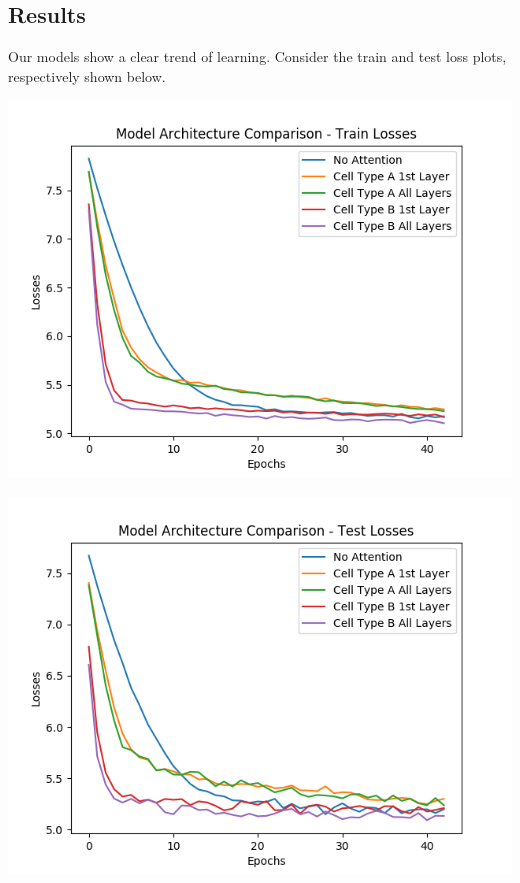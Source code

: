 \documentclass[letterpaper, 10pt]{article}
\begin{document}
\begin{multicols}{2}
\section{Results}

Our models show a clear trend of learning.
Consider the train and test loss plots, respectively shown below.

\begin{center}
\includegraphics[scale=.4]{model_comparison_losses_train}
\end{center}

\begin{center}
\includegraphics[scale=.4]{model_comparison_losses_test}
\end{center}


\end{multicols}
\end{document}
